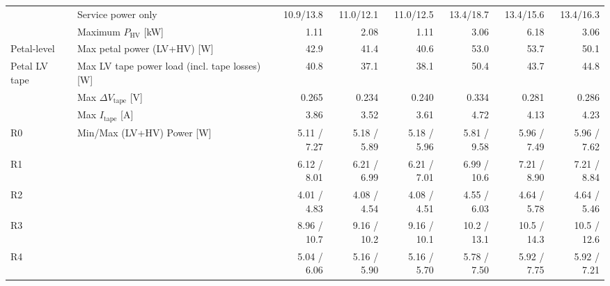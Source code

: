 \begin{table}[ht]
\begin{centering}
{\begin{tabular}{|l|l|r|r|r|r|r|r|}
                                & Service power only                                                    &     10.9/13.8 &     11.0/12.1 &     11.0/12.5 &      13.4/18.7 &     13.4/15.6 &      13.4/16.3 \\ 
                                & Maximum $P_\text{HV}$ [kW]                                            &          1.11 &          2.08 &          1.11 &           3.06 &          6.18 &           3.06 \\ \hline
Petal-level                     & Max petal power (LV+HV) [W]                                           &          42.9 &          41.4 &          40.6 &           53.0 &          53.7 &           50.1 \\ \hline
\multirow{3}{*}{Petal LV tape}  & Max LV tape power load (incl. tape losses) [W]                        &          40.8 &          37.1 &          38.1 &           50.4 &          43.7 &           44.8 \\ 
                                & Max $\Delta V_\text{tape}$ [V]                                        &         0.265 &         0.234 &         0.240 &          0.334 &         0.281 &          0.286 \\ 
                                & Max $I_\text{tape}$ [A]                                               &          3.86 &          3.52 &          3.61 &           4.72 &          4.13 &           4.23 \\ \hline
R0                              & \multirow{6}{*}{Min/Max (LV+HV) Power [W]}                            &   5.11 / 7.27 &   5.18 / 5.89 &   5.18 / 5.96 &    5.81 / 9.58 &   5.96 / 7.49 &    5.96 / 7.62 \\ 
R1                              &                                                                       &   6.12 / 8.01 &   6.21 / 6.99 &   6.21 / 7.01 &    6.99 / 10.6 &   7.21 / 8.90 &    7.21 / 8.84 \\ 
R2                              &                                                                       &   4.01 / 4.83 &   4.08 / 4.54 &   4.08 / 4.51 &    4.55 / 6.03 &   4.64 / 5.78 &    4.64 / 5.46 \\ 
R3                              &                                                                       &   8.96 / 10.7 &   9.16 / 10.2 &   9.16 / 10.1 &    10.2 / 13.1 &   10.5 / 14.3 &    10.5 / 12.6 \\ 
R4                              &                                                                       &   5.04 / 6.06 &   5.16 / 5.90 &   5.16 / 5.70 &    5.78 / 7.50 &   5.92 / 7.75 &    5.92 / 7.21 \\ 

\end{tabular}}
\end{centering}
\end{table}
